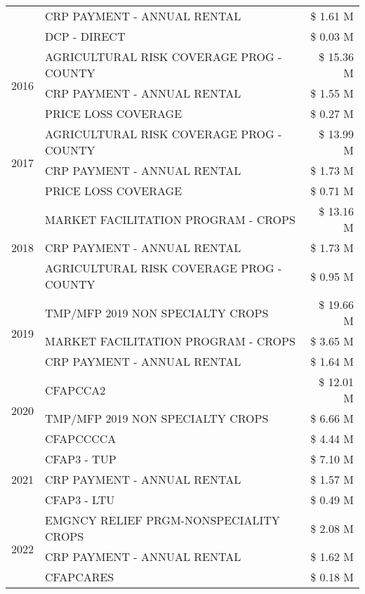 \begin{tabular}{llr}
 & CRP PAYMENT - ANNUAL RENTAL & \$ 1.61 M \\
 & DCP - DIRECT & \$ 0.03 M \\
\cline{1-3}
\multirow[t]{3}{*}{2016} & AGRICULTURAL RISK COVERAGE PROG - COUNTY & \$ 15.36 M \\
 & CRP PAYMENT - ANNUAL RENTAL & \$ 1.55 M \\
 & PRICE LOSS COVERAGE & \$ 0.27 M \\
\cline{1-3}
\multirow[t]{3}{*}{2017} & AGRICULTURAL RISK COVERAGE PROG - COUNTY & \$ 13.99 M \\
 & CRP PAYMENT - ANNUAL RENTAL & \$ 1.73 M \\
 & PRICE LOSS COVERAGE & \$ 0.71 M \\
\cline{1-3}
\multirow[t]{3}{*}{2018} & MARKET FACILITATION PROGRAM - CROPS & \$ 13.16 M \\
 & CRP PAYMENT - ANNUAL RENTAL & \$ 1.73 M \\
 & AGRICULTURAL RISK COVERAGE PROG - COUNTY & \$ 0.95 M \\
\cline{1-3}
\multirow[t]{3}{*}{2019} & TMP/MFP 2019 NON SPECIALTY CROPS & \$ 19.66 M \\
 & MARKET FACILITATION PROGRAM - CROPS & \$ 3.65 M \\
 & CRP PAYMENT - ANNUAL RENTAL & \$ 1.64 M \\
\cline{1-3}
\multirow[t]{3}{*}{2020} & CFAPCCA2 & \$ 12.01 M \\
 & TMP/MFP 2019 NON SPECIALTY CROPS & \$ 6.66 M \\
 & CFAPCCCCA & \$ 4.44 M \\
\cline{1-3}
\multirow[t]{3}{*}{2021} & CFAP3 - TUP & \$ 7.10 M \\
 & CRP PAYMENT - ANNUAL RENTAL & \$ 1.57 M \\
 & CFAP3 - LTU & \$ 0.49 M \\
\cline{1-3}
\multirow[t]{3}{*}{2022} & EMGNCY RELIEF PRGM-NONSPECIALITY CROPS & \$ 2.08 M \\
 & CRP PAYMENT - ANNUAL RENTAL & \$ 1.62 M \\
 & CFAPCARES & \$ 0.18 M \\
\cline{1-3}
\bottomrule
\end{tabular}
